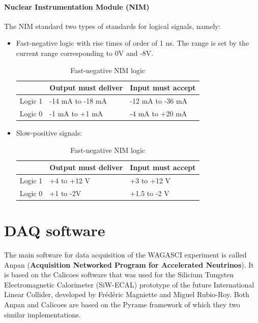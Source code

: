 \subsubsection{Nuclear Instrumentation Module (NIM)}
The NIM standard two types of standards for logical signals, namely:
\begin{itemize}
\item Fast-negative logic with rise times of order of 1 ns. The range is set
  by the current range corresponding to 0V and -8V.
  \begin{table}[H]
    \centering
    \begin{tabular}{l l l}
      \hline
      & \textbf{Output must deliver} & \textbf{Input must accept} \\
      \hline
      Logic 1 & -14 mA to -18 mA & -12 mA to -36 mA \\
      Logic 0 & -1 mA to +1 mA & -4 mA to +20 mA \\
      \hline
    \end{tabular}
    \caption{Fast-negative NIM logic}
  \end{table}
\item Slow-positive signals:
  \begin{table}[H]
    \centering
    \begin{tabular}{l l l}
      \hline
      & \textbf{Output must deliver} & \textbf{Input must accept} \\
      \hline
      Logic 1 & +4 to +12 V & +3 to +12 V \\
      Logic 0 & +1 to -2V & +1.5 to -2 V \\
      \hline
    \end{tabular}
    \caption{Fast-negative NIM logic}
  \end{table}
\end{itemize}


\chapter{DAQ software}
The main software for data acquisition of the WAGASCI experiment is called Anpan
(\textbf{Acquisition Networked Program for Accelerated Neutrinos}). It is based
on the Calicoes software that was used for the Silicium Tungsten Electromagnetic
Calorimeter (SiW-ECAL) prototype of the future International Linear Collider,
developed by Frédéric Magniette and Miguel Rubio-Roy. Both Anpan and Calicoes
are based on the Pyrame framework of which they two similar implementations.

